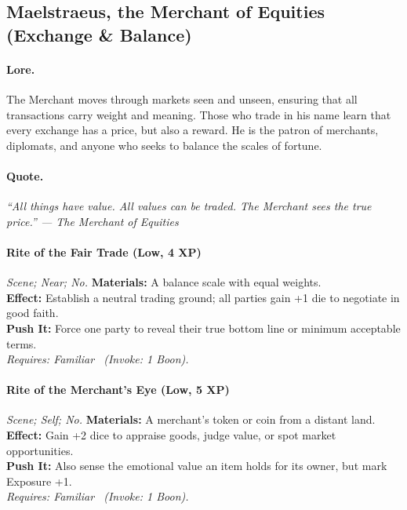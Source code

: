 \subsection{Maelstraeus, the Merchant of Equities (Exchange \& Balance)}

\paragraph{Lore.}
The Merchant moves through markets seen and unseen, ensuring that all transactions carry weight and meaning. Those who trade in his name learn that every exchange has a price, but also a reward. He is the patron of merchants, diplomats, and anyone who seeks to balance the scales of fortune.

\paragraph{Quote.}
\emph{“All things have value. All values can be traded. The Merchant sees the true price.” — The Merchant of Equities}

\paragraph{Rite of the Fair Trade (Low, 4 XP)} \emph{Scene; Near; No.}
\textbf{Materials:} A balance scale with equal weights. \\
\textbf{Effect:} Establish a neutral trading ground; all parties gain +1 die to negotiate in good faith. \\
\textbf{Push It:} Force one party to reveal their true bottom line or minimum acceptable terms. \\
\emph{Requires: Familiar \ (\textit{Invoke:} 1 Boon).}

\paragraph{Rite of the Merchant's Eye (Low, 5 XP)} \emph{Scene; Self; No.}
\textbf{Materials:} A merchant's token or coin from a distant land. \\
\textbf{Effect:} Gain +2 dice to appraise goods, judge value, or spot market opportunities. \\
\textbf{Push It:} Also sense the emotional value an item holds for its owner, but mark Exposure +1. \\
\emph{Requires: Familiar \ (\textit{Invoke:} 1 Boon).}

